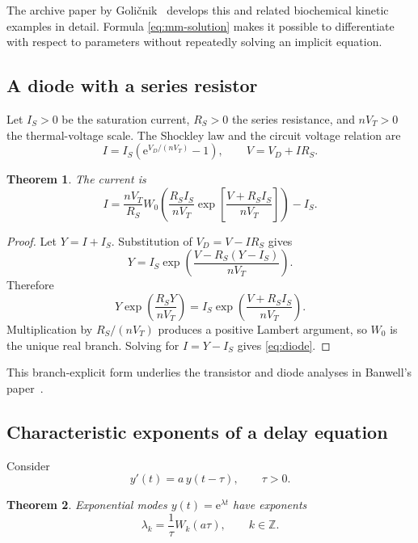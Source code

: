 \documentclass[11pt]{article}
\newtheorem{theorem}{Theorem}[section]
\theoremstyle{remark}
\newcommand{\ee}{\mathrm e}
\begin{document}
The archive paper by Goli\v{c}nik~\cite{golicnik2012} develops this and
related biochemical kinetic examples in detail.  Formula \eqref{eq:mm-solution} makes it possible to
differentiate with respect to parameters without repeatedly solving an
implicit equation.

\subsection{A diode with a series resistor}

Let \(I_S>0\) be the saturation current, \(R_S>0\) the series resistance,
and \(nV_T>0\) the thermal-voltage scale.  The Shockley law and the circuit
voltage relation are
\[
       I=I_S\left(\ee^{V_D/(nV_T)}-1\right),
       \qquad V=V_D+IR_S.
\]

\begin{theorem}\label{thm:diode}
The current is
\begin{equation}\label{eq:diode}
 I=
 \frac{nV_T}{R_S}
 W_0\left(
 \frac{R_SI_S}{nV_T}
 \exp\left[\frac{V+R_SI_S}{nV_T}\right]\right)-I_S.
\end{equation}
\end{theorem}

\begin{proof}
Let \(Y=I+I_S\).  Substitution of \(V_D=V-IR_S\) gives
\[
 Y=I_S\exp\left(\frac{V-R_S(Y-I_S)}{nV_T}\right).
\]
Therefore
\[
 Y\exp\left(\frac{R_SY}{nV_T}\right)
 =
 I_S\exp\left(\frac{V+R_SI_S}{nV_T}\right).
\]
Multiplication by \(R_S/(nV_T)\) produces a positive Lambert argument, so
\(W_0\) is the unique real branch.  Solving for \(I=Y-I_S\) gives
\eqref{eq:diode}.
\end{proof}

This branch-explicit form underlies the transistor and diode analyses in
Banwell's paper~\cite{banwell2000}.

\subsection{Characteristic exponents of a delay equation}

Consider
\begin{equation}\label{eq:dde}
       y'(t)=a\,y(t-\tau),\qquad \tau>0.
\end{equation}

\begin{theorem}\label{thm:dde}
Exponential modes \(y(t)=\ee^{\lambda t}\) have exponents
\begin{equation}\label{eq:dde-spectrum}
       \lambda_k=\frac1\tau W_k(a\tau),
       \qquad k\in\mathbb Z.
\end{equation}
\end{theorem}
\end{document}

